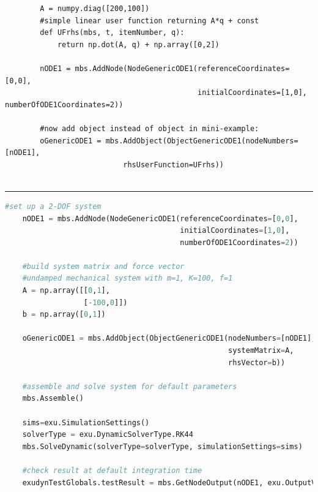    \userFunctionExample{}
    \pythonstyle\begin{lstlisting}
        A = numpy.diag([200,100])
        #simple linear user function returning A*q + const
        def UFrhs(mbs, t, itemNumber, q): 
            return np.dot(A, q) + np.array([0,2])
            
        nODE1 = mbs.AddNode(NodeGenericODE1(referenceCoordinates=[0,0],
                                            initialCoordinates=[1,0], numberOfODE1Coordinates=2))

        #now add object instead of object in mini-example:
        oGenericODE1 = mbs.AddObject(ObjectGenericODE1(nodeNumbers=[nODE1], 
                           rhsUserFunction=UFrhs))
                                     
    \end{lstlisting}
\vspace{6pt}\par\noindent\rule{\textwidth}{0.4pt}
\label{miniExample_ObjectGenericODE1}
\pythonstyle
\begin{lstlisting}[language=Python, firstnumber=1]
    #set up a 2-DOF system
    nODE1 = mbs.AddNode(NodeGenericODE1(referenceCoordinates=[0,0],
                                        initialCoordinates=[1,0],
                                        numberOfODE1Coordinates=2))

    #build system matrix and force vector
    #undamped mechanical system with m=1, K=100, f=1
    A = np.array([[0,1],
                  [-100,0]])
    b = np.array([0,1])
    
    oGenericODE1 = mbs.AddObject(ObjectGenericODE1(nodeNumbers=[nODE1], 
                                                   systemMatrix=A, 
                                                   rhsVector=b))
    
    #assemble and solve system for default parameters
    mbs.Assemble()
    
    sims=exu.SimulationSettings()
    solverType = exu.DynamicSolverType.RK44
    mbs.SolveDynamic(solverType=solverType, simulationSettings=sims)

    #check result at default integration time
    exudynTestGlobals.testResult = mbs.GetNodeOutput(nODE1, exu.OutputVariableType.Coordinates)[0]
\end{lstlisting}

